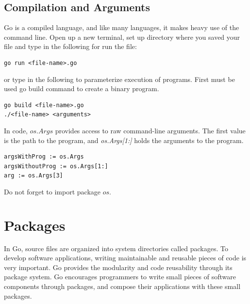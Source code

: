 \documentclass[
  twoside, 12pt, 
  printed, %
  notable,   %
  lof,     %
  lot,     %
]{fithesis3}
\begin{document}
\subsection{Compilation and Arguments}
Go is a compiled language, and like many languages, it makes heavy use of the command
line. Open up a new terminal, set up directory where you saved your file and type in the following for run the file:
\begin{lstlisting}
go run <file-name>.go
\end{lstlisting}
or type in the following to parameterize execution of programs. First must be used go build command to create a binary program.
\begin{lstlisting}
go build <file-name>.go
./<file-name> <arguments>
\end{lstlisting}
In code, $os.Args$ provides access to raw command-line arguments. The first value is the path to the program, and \textit{os.Args[1:]} holds the arguments to the program.
\begin{lstlisting}
argsWithProg := os.Args
argsWithoutProg := os.Args[1:]
arg := os.Args[3]
\end{lstlisting}
Do not forget to import package $os$.

\section{Packages}
In Go, source files are organized into system directories called packages. To  develop 
software applications, writing maintainable and reusable pieces of code is very important. Go 
provides the modularity and code reusability through its package system. Go encourages 
programmers to write small pieces of software components through packages, and compose their  
applications with these small packages.
\end{document}
